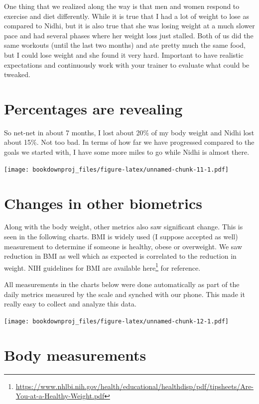 \documentclass[
  oneside]{book}
\DeclareRobustCommand{\href}[2]{#2\footnote{\url{#1}}}
\begin{document}
One thing that we realized along the way is that men and women respond to exercise and diet differently. While it is true that I had a lot of weight to lose as compared to Nidhi, but it is also true that she was losing weight at a much slower pace and had several phases where her weight loss just stalled. Both of us did the same workouts (until the last two months) and ate pretty much the same food, but I could lose weight and she found it very hard. Important to have realistic expectations and continuously work with your trainer to evaluate what could be tweaked.

\hypertarget{percentages-are-revealing}{%
\section{Percentages are revealing}\label{percentages-are-revealing}}

So net-net in about 7 months, I lost about 20\% of my body weight and Nidhi lost about 15\%. Not too bad. In terms of how far we have progressed compared to the goals we started with, I have some more miles to go while Nidhi is almost there.

\texttt{[image: bookdownproj\_files/figure-latex/unnamed-chunk-11-1.pdf]}

\hypertarget{changes-in-other-biometrics}{%
\section{Changes in other biometrics}\label{changes-in-other-biometrics}}

Along with the body weight, other metrics also saw significant change. This is seen in the following charts. BMI is widely used (I suppose accepted as well) measurement to determine if someone is healthy, obese or overweight. We saw reduction in BMI as well which as expected is correlated to the reduction in weight. NIH guidelines for BMI are available \href{https://www.nhlbi.nih.gov/health/educational/healthdisp/pdf/tipsheets/Are-You-at-a-Healthy-Weight.pdf}{here} for reference.

All measurements in the charts below were done automatically as part of the daily metrics measured by the scale and synched with our phone. This made it really easy to collect and analyze this data.

\texttt{[image: bookdownproj\_files/figure-latex/unnamed-chunk-12-1.pdf]}

\hypertarget{body-measurements}{%
\section{Body measurements}\label{body-measurements}}
\end{document}
